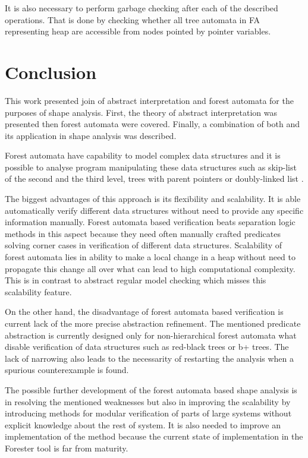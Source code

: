 \documentclass[a4paper, 12pt]{article}
\begin{document}
It is also necessary to perform garbage checking after each of the described operations.
That is done by checking whether all tree automata in FA representing heap are accessible
from nodes pointed by pointer variables.

\section{Conclusion}

This work presented join of abstract interpretation and forest automata
for the purposes of shape analysis.
First, the theory of abstract interpretation was presented then forest automata
were covered.
Finally, a combination of both and its application in shape analysis
was described.

Forest automata have capability to model complex data structures
and it is possible to analyse program manipulating these data structures
such as skip-list of the second and the third level, trees with parent pointers
or doubly-linked list \cite{sv-comp}.

The biggest advantages of this approach is its flexibility and scalability.
It is able automatically verify different data structures without need to
provide any specific information manually.
Forest automata based verification beats separation logic methods in this aspect
because they need often manually crafted predicates solving corner cases in verification
of different data structures.
Scalability of forest automata lies in ability to make a local
change in a heap without need to propagate this change all over
what can lead to high computational complexity.
This is in contrast to abstract regular model checking which
misses this scalability feature.

On the other hand, the disadvantage of forest automata based verification
is current lack of the more precise abstraction refinement.
The mentioned predicate abstraction is currently designed only for
non-hierarchical forest automata what disable verification of
data structures such as red-black trees or b+ trees.
The lack of narrowing also leads to the necessarity of restarting
the analysis when a spurious counterexample is found.

The possible further development of the forest automata based shape analysis
is in resolving the mentioned weaknesses but also in improving
the scalability by introducing methods for modular verification
of parts of large systems without explicit knowledge about the rest of system.
It is also needed to improve an implementation of the method because
the current state of implementation in the Forester tool is far from maturity.

\newpage


\end{document}
